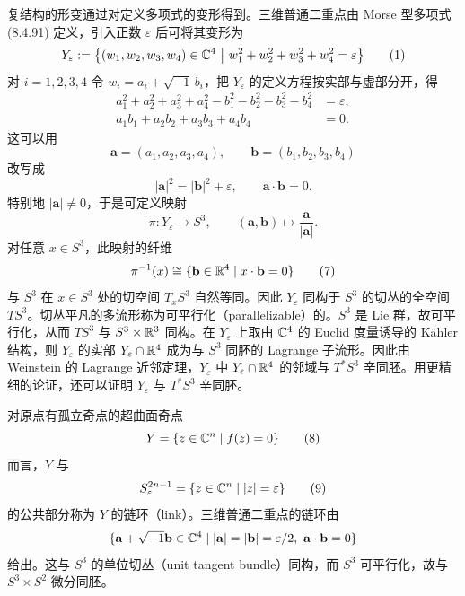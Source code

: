 复结构的形变通过对定义多项式的变形得到。三维普通二重点由 Morse 型多项式 (8.4.91) 定义，引入正数 $\varepsilon$ 后可将其变形为
\begin{equation*}
Y_\varepsilon:=\bigl\{(w_1,w_2,w_3,w_4)\in\C^4\ \big|\ w_1^2+w_2^2+w_3^2+w_4^2=\varepsilon\bigr\}
\tag{1}
\end{equation*}
对 $i=1,2,3,4$ 令 $w_i=a_i+\sqrt{-1}\,b_i$，把 $Y_\varepsilon$ 的定义方程按实部与虚部分开，得
\begin{align*}
a_1^2+a_2^2+a_3^2+a_4^2-b_1^2-b_2^2-b_3^2-b_4^2&=\varepsilon, \tag{2}\\
a_1b_1+a_2b_2+a_3b_3+a_4b_4&=0. \tag{3}
\end{align*}
这可以用
\begin{equation*}
\mathbf{a}=(a_1,a_2,a_3,a_4),\qquad \mathbf{b}=(b_1,b_2,b_3,b_4)
\tag{4}
\end{equation*}
改写成
\begin{equation*}
|\mathbf{a}|^2=|\mathbf{b}|^2+\varepsilon,\qquad \mathbf{a}\cdot\mathbf{b}=0.
\tag{5}
\end{equation*}
特别地 $|\mathbf{a}|\neq0$，于是可定义映射
\begin{equation*}
\pi:Y_\varepsilon\longrightarrow S^3,\qquad (\mathbf{a},\mathbf{b})\longmapsto \frac{\mathbf{a}}{|\mathbf{a}|}.
\tag{6}
\end{equation*}
对任意 $x\in S^3$，此映射的纤维
\begin{equation*}
\pi^{-1}(x)\cong\{\mathbf{b}\in\mathbb{R}^4\mid x\cdot\mathbf{b}=0\}
\tag{7}
\end{equation*}
与 $S^3$ 在 $x\in S^3$ 处的切空间 $T_xS^3$ 自然等同。因此 $Y_\varepsilon$ 同构于 $S^3$ 的切丛的全空间 $TS^3$。切丛平凡的多流形称为可平行化（parallelizable）的。$S^3$ 是 Lie 群，故可平行化，从而 $TS^3$ 与 $S^3\times\mathbb{R}^3$ 同构。在 $Y_\varepsilon$ 上取由 $\mathbb{C}^4$ 的 Euclid 度量诱导的 Kähler 结构，则 $Y_\varepsilon$ 的实部 $Y_\varepsilon\cap\mathbb{R}^4$ 成为与 $S^3$ 同胚的 Lagrange 子流形。因此由 Weinstein 的 Lagrange 近邻定理，$Y_\varepsilon$ 中 $Y_\varepsilon\cap\mathbb{R}^4$ 的邻域与 $T^*S^3$ 辛同胚。用更精细的论证，还可以证明 $Y_\varepsilon$ 与 $T^*S^3$ 辛同胚。


对原点有孤立奇点的超曲面奇点
\begin{equation*}
Y=\{z\in\mathbb{C}^n\mid f(z)=0\}
\tag{8}
\end{equation*}
而言，$Y$ 与
\begin{equation*}
S_\varepsilon^{2n-1}=\{z\in\mathbb{C}^n\mid |z|=\varepsilon\}
\tag{9}
\end{equation*}
的公共部分称为 $Y$ 的链环（link）。三维普通二重点的链环由
\begin{equation*}
\{\mathbf{a}+\sqrt{-1}\mathbf{b}\in\C^4\mid |\mathbf{a}|=|\mathbf{b}|=\varepsilon/2,\ \mathbf{a}\cdot\mathbf{b}=0\}
\end{equation*}
给出。这与 $S^3$ 的单位切丛（unit tangent bundle）同构，而 $S^3$ 可平行化，故与 $S^3\times S^2$ 微分同胚。


